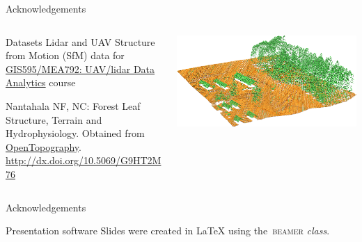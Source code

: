 \documentclass[xcolor={dvipsnames,usenames},beamer,aspectratio=43]{beamer}
\newcommand{\backupend}{
   \setcounter{framenumber}{\value{finalframe}}
}
\begin{document}
\begin{frame}{Acknowledgements}

\begin{columns}
\begin{column}{0.48\textwidth}

\begin{block}{Datasets}
\footnotesize
Lidar and UAV Structure from Motion (SfM) data for
\href{http://ncsu-osgeorel.github.io/uav-lidar-analytics-course/}%
  {GIS595/MEA792: UAV/lidar Data Analytics} course

\smallskip

Nantahala NF, NC: Forest Leaf Structure, Terrain and Hydrophysiology.
Obtained from \href{http://www.opentopography.org/}{OpenTopography}.
\url{http://dx.doi.org/10.5069/G9HT2M76}
\end{block}

\end{column}
\begin{column}{0.47\textwidth}

\begin{center}
  \includegraphics[width=\textwidth]{lidar_secref_3d}
\end{center}

\end{column}
\end{columns}

\end{frame}

\begin{frame}{Acknowledgements}

\begin{block}{Presentation software}
\Huge
\textrm{Slides were created in \LaTeX{} using the~\textsc{beamer} \textit{class}.}
\end{block}

\end{frame}

\backupend
\end{document}
